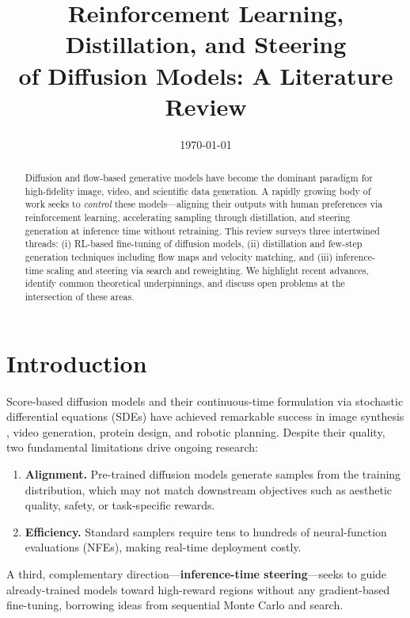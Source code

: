 \documentclass[11pt]{article}
\title{Reinforcement Learning, Distillation, and Steering\\of Diffusion Models: A Literature Review}
\author{}
\date{\today}
\begin{document}
\maketitle

\begin{abstract}
Diffusion and flow-based generative models have become the dominant paradigm for high-fidelity image, video, and scientific data generation.
A rapidly growing body of work seeks to \emph{control} these models---aligning their outputs with human preferences via reinforcement learning, accelerating sampling through distillation, and steering generation at inference time without retraining.
This review surveys three intertwined threads:
(i) RL-based fine-tuning of diffusion models,
(ii) distillation and few-step generation techniques including flow maps and velocity matching, and
(iii) inference-time scaling and steering via search and reweighting.
We highlight recent advances, identify common theoretical underpinnings, and discuss open problems at the intersection of these areas.
\end{abstract}

\tableofcontents
\newpage

\section{Introduction}
\label{sec:intro}

Score-based diffusion models \citep{song2021scorebased,ho2020denoising} and their continuous-time formulation via stochastic differential equations (SDEs) \citep{song2021sde} have achieved remarkable success in image synthesis \citep{dhariwal2021diffusion}, video generation, protein design, and robotic planning.
Despite their quality, two fundamental limitations drive ongoing research:
\begin{enumerate}
    \item \textbf{Alignment.} Pre-trained diffusion models generate samples from the training distribution, which may not match downstream objectives such as aesthetic quality, safety, or task-specific rewards.
    \item \textbf{Efficiency.} Standard samplers require tens to hundreds of neural-function evaluations (NFEs), making real-time deployment costly.
\end{enumerate}

A third, complementary direction---\textbf{inference-time steering}---seeks to guide already-trained models toward high-reward regions without any gradient-based fine-tuning, borrowing ideas from sequential Monte Carlo and search.
\end{document}
